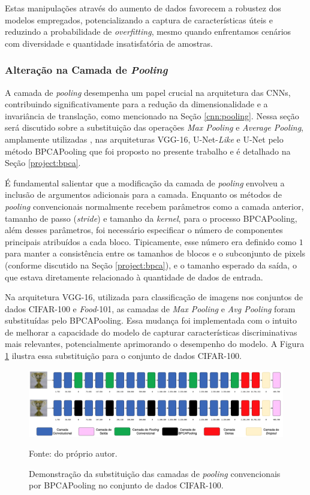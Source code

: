 Estas manipulações através do aumento de dados favorecem a robustez dos modelos empregados, potencializando a captura de características úteis e reduzindo a probabilidade de \textit{overfitting}, mesmo quando enfrentamos cenários com diversidade e quantidade insatisfatória de amostras.

\subsubsection{Alteração na Camada de \textit{Pooling}}
\label{project:change_pooling}
A camada de \textit{pooling} desempenha um papel crucial na arquitetura das CNNs, contribuindo significativamente para a redução da dimensionalidade e a invariância de translação, como mencionado na Seção \ref{cnn:pooling}. Nessa seção será discutido sobre a substituição das operações \textit{Max Pooling} e \textit{Average Pooling}, amplamente utilizadas \citep{Ozdemir2023Avg-topk:Networks}, nas arquiteturas VGG-16, U-Net-\textit{Like} e U-Net pelo método BPCAPooling que foi proposto no presente trabalho e é detalhado na Seção \ref{project:bpca}.

É fundamental salientar que a modificação da camada de \textit{pooling} envolveu a inclusão de argumentos adicionais para a camada. Enquanto os métodos de \textit{pooling} convencionais normalmente recebem parâmetros como a camada anterior, tamanho de passo (\textit{stride}) e tamanho da \textit{kernel}, para o processo BPCAPooling, além desses parâmetros, foi necessário especificar o número de componentes principais atribuídos a cada bloco. Tipicamente, esse número era definido como $1$ para manter a consistência entre os tamanhos de blocos e o subconjunto de pixels (conforme discutido na Seção \ref{project:bpca}), e o tamanho esperado da saída, o que estava diretamente relacionado à quantidade de dados de entrada.

Na arquitetura VGG-16, utilizada para classificação de imagens nos conjuntos de dados CIFAR-100 e \textit{Food}-101, as camadas de \textit{Max Pooling} e \textit{Avg Pooling} foram substituídas pelo BPCAPooling. Essa mudança foi implementada com o intuito de melhorar a capacidade do modelo de capturar características discriminativas mais relevantes, potencialmente aprimorando o desempenho do modelo. A Figura \ref{project:fig:change_pooling:vgg-cifar} ilustra essa substituição para o conjunto de dados CIFAR-100.

\begin{figure}[H]
    \centering
    \caption{Demonstração da substituição das camadas de \textit{pooling} convencionais por BPCAPooling no conjunto de dados CIFAR-100.}
    \includegraphics[width=1\textwidth]{recursos/imagens/project/vgg-with-bpca-cifar.png}
    \label{project:fig:change_pooling:vgg-cifar}

    Fonte: do próprio autor.
\end{figure}

